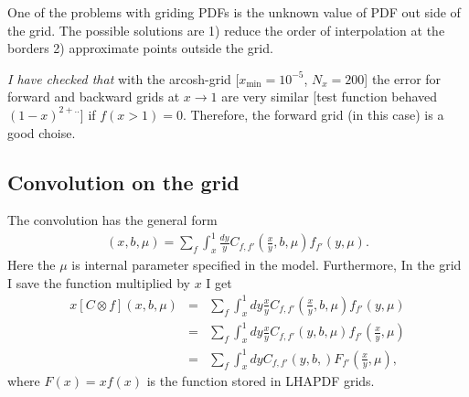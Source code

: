 \documentclass[prd,nofootinbib,eqsecnum,final]{revtex4}
\newcommand{\nn}{\nonumber}
\renewcommand{\(}{\left(}
\renewcommand{\)}{\right)}
\renewcommand{\[}{\left[}
\renewcommand{\]}{\right]}
\begin{document}
One of the problems with griding PDFs is the unknown value of PDF out side of the grid. The possible solutions are 1) reduce the order of interpolation at the borders 2) approximate points outside the grid. 

\textit{I have checked that} with the arcosh-grid [$x_\text{min}=10^{-5}$, $N_x=200$] the error for forward and backward grids at $x\to1$ are very similar [test function behaved $(1-x)^{2+..}$] if $f(x>1)=0$. Therefore, the forward grid (in this case) is a good choise.


\subsection{Convolution on the grid}


The convolution has the general form
\begin{eqnarray}
[C\otimes f](x,b,\mu)=\sum_f\int_x^1 \frac{dy}{y} C_{f,f'}\(\frac{x}{y},b,\mu\)f_{f'}(y,\mu).
\end{eqnarray}
Here the $\mu$ is internal parameter specified in the model. Furthermore, In the grid I save the function multiplied by $x$ I get
\begin{eqnarray}
x[C\otimes f](x,b,\mu)&=&
\sum_f\int_x^1 dy\frac{x}{y} C_{f,f'}\(\frac{x}{y},b,\mu\)f_{f'}(y,\mu)
\\\nn
&=&
\sum_f\int_x^1 dy\frac{x}{y} C_{f,f'}(y,b,\mu)f_{f'}\(\frac{x}{y},\mu\)
\\\nn
&=&
\sum_f\int_x^1 dy C_{f,f'}(y,b,)F_{f'}\(\frac{x}{y},\mu\),
\end{eqnarray}
where $F(x)=xf(x)$ is the function stored in LHAPDF grids.
\end{document}
